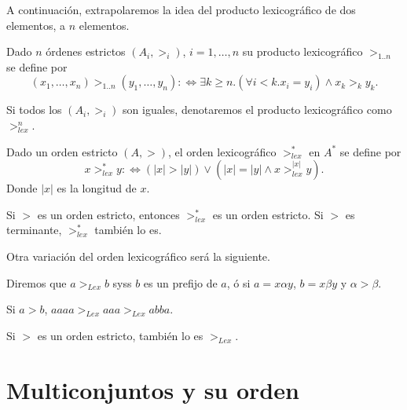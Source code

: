 A continuación, extrapolaremos la idea del producto lexicográfico de dos
elementos, a $n$ elementos.

\begin{defi}
  Dado $n$ órdenes estrictos $(A_i,>_i)$, $i=1,\dots,n$ su producto
  lexicográfico $>_{1..n}$ se define por
  \[(x_1,\dots,x_n) >_{1..n}  (y_1,\dots,y_n) :\Leftrightarrow 
    \exists k \geq n. (\forall i < k. x_i = y_i) \wedge x_k >_k y_k.\]
\end{defi} 

\begin{nota} 
  Si todos los $(A_i,>_i)$ son iguales, denotaremos el producto lexicográfico
  como $>^n_{lex}$.
\end{nota}


\begin{defi}
  Dado un orden estricto $(A,>)$, el orden lexicográfico $>^*_{lex}$ en $A^*$
  se define por
  \[x >^*_{lex} y :\Leftrightarrow (|x| > |y|) \vee (|x| = |y| \wedge x >^{|x|}_{lex} y).\]
  Donde $|x|$ es la longitud de $x$.
\end{defi} 

\begin{lema}
  Si $>$ es un orden estricto, entonces $>^*_{lex}$ es un orden estricto. Si $>$ es
  terminante, $>^*_{lex}$ también lo es.
\end{lema}

Otra variación del orden lexicográfico será la siguiente.

\begin{defi}
  Diremos que $a >_{Lex} b$ syss $b$ es un prefijo de $a$, ó si
  $a = x \alpha y$, $b = x \beta y$ y $\alpha > \beta$.
\end{defi}

\begin{ejem}
  Si $a>b$, $aaaa >_{Lex} aaa >_{Lex} abba$.
\end{ejem}

\begin{lema}
  Si $>$ es un orden estricto, también lo es $>_{Lex}$.
\end{lema}


\section{Multiconjuntos y su orden}\label{ormult}

